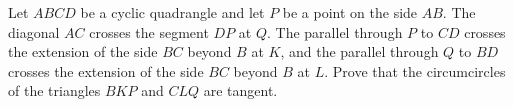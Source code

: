 Let $ABCD$ be a cyclic quadrangle and let $P$ be a point on the side $AB$. The diagonal $AC$ crosses the segment $DP$ at $Q$. The parallel through $P$ to $CD$ crosses the extension of the side $BC$ beyond $B$ at $K$, and the parallel through $Q$ to $BD$ crosses the extension of the side $BC$ beyond $B$ at $L$. Prove that the circumcircles of the triangles $BKP$ and $CLQ$ are tangent.